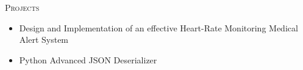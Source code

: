 \documentclass[11pt]{article}
\renewcommand{\section}[1]
{\vspace{1.0\baselineskip}{\Large\textbf{#1}}}
\newcommand{\makecolophon}
{\centering\ding{118} Last modified on \today~\ding{118}}
\begin{document}
\textsc{Projects}
\begin{itemize}
    \item[] Design and Implementation of an effective Heart-Rate Monitoring Medical Alert System
    \item[] Python Advanced JSON Deserializer
\end{itemize}





\end{document}
